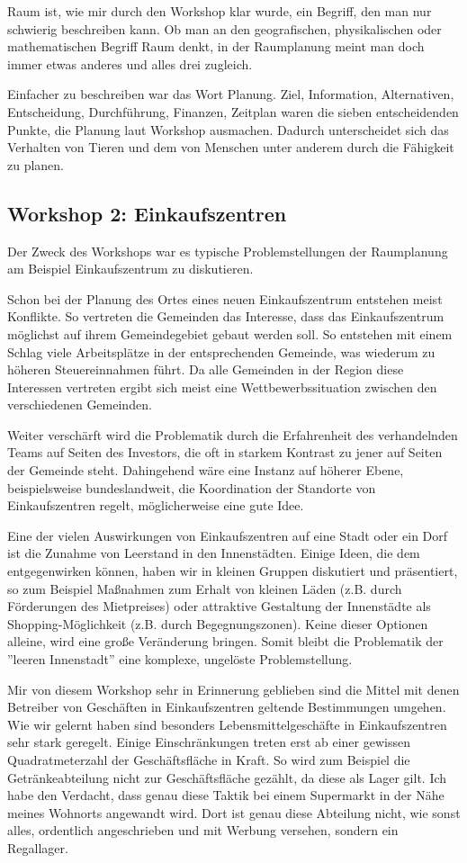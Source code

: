 \documentclass[]{article}
\begin{document}
Raum ist, wie mir durch den Workshop klar wurde, ein Begriff, den man nur schwierig beschreiben kann. Ob man an den geografischen, physikalischen oder mathematischen Begriff Raum denkt, in der Raumplanung meint man doch immer etwas anderes und alles drei zugleich.

Einfacher zu beschreiben war das Wort Planung. Ziel, Information, Alternativen, Entscheidung, Durchführung, Finanzen, Zeitplan waren die sieben entscheidenden Punkte, die Planung laut Workshop ausmachen. Dadurch unterscheidet sich das Verhalten von Tieren und dem von Menschen unter anderem durch die Fähigkeit zu planen.

\subsection{Workshop 2: Einkaufszentren}
\label{sec:einkaufszentren}
Der Zweck des Workshops war es typische Problemstellungen der Raumplanung am Beispiel Einkaufszentrum zu diskutieren.

Schon bei der Planung des Ortes eines neuen Einkaufszentrum entstehen meist Konflikte. So vertreten die Gemeinden das Interesse, dass das Einkaufszentrum möglichst auf ihrem Gemeindegebiet gebaut werden soll. So entstehen mit einem Schlag viele Arbeitsplätze in der entsprechenden Gemeinde, was wiederum zu höheren Steuereinnahmen führt. Da alle Gemeinden in der Region diese Interessen vertreten ergibt sich meist eine Wettbewerbssituation zwischen den verschiedenen Gemeinden.

Weiter verschärft wird die Problematik durch die Erfahrenheit des verhandelnden Teams auf Seiten des Investors, die oft in starkem Kontrast zu jener auf Seiten der Gemeinde steht. Dahingehend wäre eine Instanz auf höherer Ebene, beispielsweise bundeslandweit, die Koordination der Standorte von Einkaufszentren regelt, möglicherweise eine gute Idee.

Eine der vielen Auswirkungen von Einkaufszentren auf eine Stadt oder ein Dorf ist die Zunahme von Leerstand in den Innenstädten. Einige Ideen, die dem entgegenwirken können, haben wir in kleinen Gruppen diskutiert und präsentiert, so zum Beispiel Maßnahmen zum Erhalt von kleinen Läden (z.B. durch Förderungen des Mietpreises) oder attraktive Gestaltung der Innenstädte als Shopping-Möglichkeit (z.B. durch Begegnungszonen). Keine dieser Optionen alleine, wird eine große Veränderung bringen. Somit bleibt die Problematik der ''leeren Innenstadt'' eine komplexe, ungelöste Problemstellung.

Mir von diesem Workshop sehr in Erinnerung geblieben sind die Mittel mit denen Betreiber von Geschäften in Einkaufszentren geltende Bestimmungen umgehen. Wie wir gelernt haben sind besonders Lebensmittelgeschäfte in Einkaufszentren sehr stark geregelt. Einige Einschränkungen treten erst ab einer gewissen Quadratmeterzahl der Geschäftsfläche in Kraft. So wird zum Beispiel die Getränkeabteilung nicht zur Geschäftsfläche gezählt, da diese als Lager gilt. Ich habe den Verdacht, dass genau diese Taktik bei einem Supermarkt in der Nähe meines Wohnorts angewandt wird. Dort ist genau diese Abteilung nicht, wie sonst alles, ordentlich angeschrieben und mit Werbung versehen, sondern ein Regallager.
\end{document}
